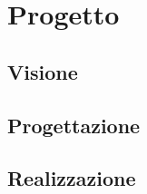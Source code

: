 \chapter{Progetto}
\setcounter{secnumdepth}{5}
\setcounter{tocdepth}{5}

\section{Visione}
\section{Progettazione}
\section{Realizzazione}